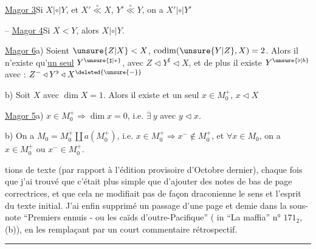 \uline{Magor 3}\quad Si $X|\circ|Y$, et $X'\overset{\circ}{\ll}X$, $Y'\overset{\circ}{\ll}Y$, on a $X'|\circ|Y'$

-- \uline{Magor 4}\quad Si $X<Y$, alors $X|\circ|Y$.

\uline{Magor 6}\quad a) Soient $\unsure{Z|X}<X$, $\operatorname{codim}(\unsure{Y|Z},X)=2$. Alors il n'existe qu'\uline{un seul} $Y^{\unsure{\sharp|*}}$, avec $Z\triangleleft Y^{\sharp}\triangleleft X$, et de plus il existe $Y^{\unsure{\flat|b}}$ avec : $Z^-\triangleleft Y^{\flat}\triangleleft X^{\deleted{\unsure{-}}}$

b) Soit $X$ avec $\dim X=1$. Alors il existe et un seul $x\in M_0^+$, $x\triangleleft X$ 

\uline{Magor 5}\quad a) $x\in M_0^+\Longrightarrow\dim x=0$, i.e. $\overline{\exists}\ y$ avec $y\triangleleft x$.

b) On a $M_0=M_0^+\amalg a(M_0^+)$, i.e.  $x\in M_0^+\Longrightarrow x^-\notin M_0^+$, et $\forall x\in M_0$, on a $x\in M_0^+$ ou $x^-\in M_0^+$.


tions de texte (par rapport à l'édition provisoire d'Octobre dernier), chaque fois que j'ai trouvé que c'était plus simple que d'ajouter des notes de bas de page correctrices, et que cela ne modifiait pas de façon draconienne le sens et l'esprit du texte initial. J'ai enfin supprimé un passage d'une page et demie dans la sous-note ``Premiers ennuis - ou les caïds d'outre-Pacifique'' ( in ``La maffia'' n° $171_2$, (b)), en les remplaçant par un court commentaire rétrospectif.

\noindent\rule{2cm}{0.4pt}

